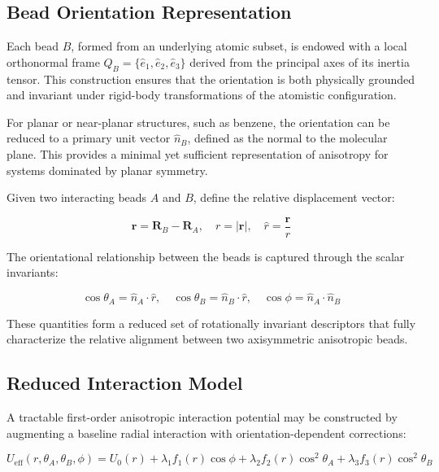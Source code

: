 \documentclass[11pt]{article}
\begin{document}
\subsection{Bead Orientation Representation}

Each bead $B$, formed from an underlying atomic subset, is endowed with a local orthonormal frame $Q_B = \{\hat{e}_1, \hat{e}_2, \hat{e}_3\}$ derived from the principal axes of its inertia tensor. This construction ensures that the orientation is both physically grounded and invariant under rigid-body transformations of the atomistic configuration.

For planar or near-planar structures, such as benzene, the orientation can be reduced to a primary unit vector $\hat{n}_B$, defined as the normal to the molecular plane. This provides a minimal yet sufficient representation of anisotropy for systems dominated by planar symmetry.

Given two interacting beads $A$ and $B$, define the relative displacement vector:

\begin{equation}
\mathbf{r} = \mathbf{R}_B - \mathbf{R}_A, \quad
r = |\mathbf{r}|, \quad
\hat{r} = \frac{\mathbf{r}}{r}
\end{equation}

The orientational relationship between the beads is captured through the scalar invariants:

\begin{equation}
\cos\theta_A = \hat{n}_A \cdot \hat{r}, \quad
\cos\theta_B = \hat{n}_B \cdot \hat{r}, \quad
\cos\phi = \hat{n}_A \cdot \hat{n}_B
\end{equation}

These quantities form a reduced set of rotationally invariant descriptors that fully characterize the relative alignment between two axisymmetric anisotropic beads.

\subsection{Reduced Interaction Model}

A tractable first-order anisotropic interaction potential may be constructed by augmenting a baseline radial interaction with orientation-dependent corrections:

\begin{equation}
U_{\text{eff}}(r,\theta_A,\theta_B,\phi)
=
U_0(r)
+
\lambda_1 f_1(r)\cos\phi
+
\lambda_2 f_2(r)\cos^2\theta_A
+
\lambda_3 f_3(r)\cos^2\theta_B
\end{equation}
\end{document}
